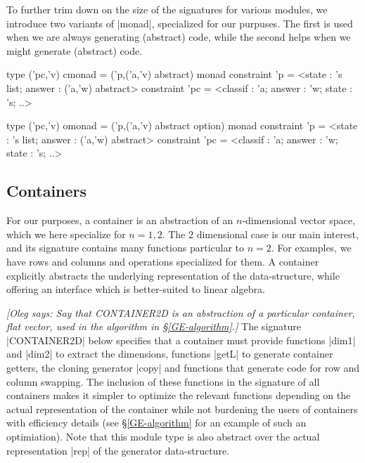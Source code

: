 \documentclass{elsart}
\newcommand{\oleg}[1]{{\it [Oleg says: #1]}}
\begin{document}
To further trim down on the size of the signatures for various modules,
we introduce two variants of |monad|, specialized for our purpuses.  The
first is used when we are always generating (abstract) code, while the second
helps when we might generate (abstract) code.
\begin{code}
type ('pc,'v) cmonad = 
  ('p,('a,'v) abstract) monad
    constraint
      'p = <state : 's list; answer : ('a,'w) abstract>
    constraint
      'pc = <classif : 'a; answer : 'w; state : 's; ..>
       
type ('pc,'v) omonad = 
  ('p,('a,'v) abstract option) monad
    constraint
      'p = <state : 's list; answer : ('a,'w) abstract>
    constraint
      'pc = <classif : 'a; answer : 'w; state : 's; ..>
\end{code}
\subsection{Containers}

For our purposes, a container is an abstraction of an $n$-dimensional
vector space, which we here specialize for $n=1,2$.  The $2$ dimensional
case is our main interest, and its signature contains many functions particular
to $n=2$.  For examples, we have rows and columns and operations specialized
for them.  A container explicitly abstracts the underlying representation 
of the data-structure, while offering an interface which is better-suited
to linear algebra.

\oleg{Say that CONTAINER2D is an abstraction of a particular
  container, flat vector, used in the algorithm in
  \S\ref{GE-algorithm}.}
The signature |CONTAINER2D| below specifies that a container must provide
functions |dim1| and |dim2| to extract the dimensions, functions |getL|
to generate container getters, the cloning
generator |copy| and functions that generate code for row and column
swapping. The inclusion of these functions in the signature of all
containers makes it simpler to optimize the relevant functions
depending on the actual representation of the container while not
burdening the users of containers with efficiency details (see
\S\ref{GE-algorithm} for an example of such an optimiation).  Note that
this module type is also abstract over the actual representation 
|rep| of the generator data-structure.
\end{document}
